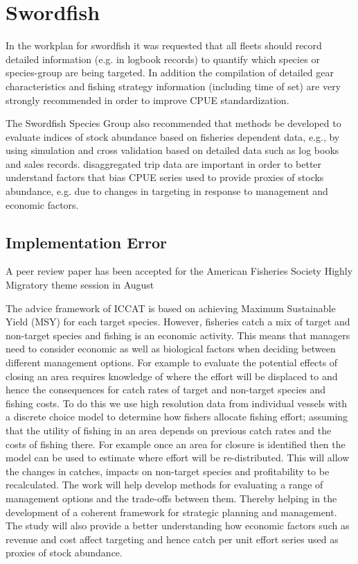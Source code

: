 \documentclass[a4paper,10pt]{article}
\begin{document}
\section{Swordfish}

In the workplan for swordfish it was requested that all fleets should record detailed information (e.g. in logbook records) to quantify 
which species or species-group are being targeted. In addition the compilation of detailed gear characteristics and fishing 
strategy information (including time of set) are very strongly recommended in order to improve CPUE standardization.

The Swordfish Species Group also recommended that methods be developed to evaluate indices of stock abundance based on fisheries dependent data, 
e.g., by using simulation and cross validation based on detailed data such as log books and sales records.
disaggregated trip data are important in order to better understand factors that bias CPUE series used to provide proxies of
stocks abundance, e.g. due to changes in targeting in response to management and economic factors. 

\subsection{Implementation Error}

A peer review paper  has been accepted for the American Fisheries Society Highly Migratory theme session in August  

The advice framework of ICCAT is based on achieving Maximum Sustainable Yield (MSY) for each target species. However, 
fisheries catch a mix of target and non-target species and fishing is an economic activity. This means that managers 
need to consider economic as well as biological factors when deciding between different management options.
For example to evaluate the potential effects of closing an area requires knowledge of where the effort will be 
displaced to and hence the consequences for catch rates of target and non-target species and fishing costs. 
To do this we use high resolution data from individual vessels with a discrete choice model to determine how fishers allocate 
fishing effort; assuming that the utility of fishing in an area depends on previous catch rates and the 
costs of fishing there. For example once an area for closure is identified then the model can be used to estimate 
where effort will be re-distributed. This will allow the changes in
catches, impacts on non-target species and profitability to be recalculated.
The work will help develop methods for evaluating a range of management options and the trade-offs between them.
Thereby helping in the development of a coherent framework for strategic planning and management.
The study will also provide a better understanding how economic factors such as revenue and cost affect targeting and
hence catch per unit effort series used as proxies of stock abundance.  
\end{document}
